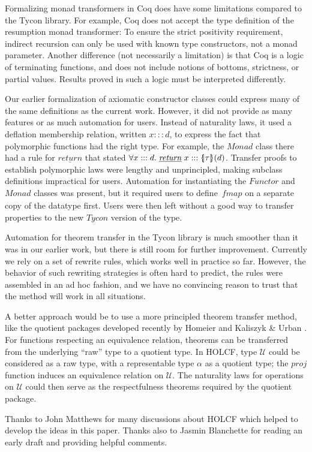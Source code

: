 \documentclass{sigplanconf}
\newcommand{\U}{\ensuremath{\mathcal{U}}}
\newcommand{\univ}[1]{\ensuremath{\underline{#1}}}
\newcommand{\symlbrace}{\mathopen{\lbrace\mkern-4.5mu\mid}}
\newcommand{\symrbrace}{\mathclose{\mid\mkern-4.5mu\rbrace}}
\newcommand{\TC}[1]{\ensuremath{\symlbrace#1\symrbrace}}
\newcommand{\hsc}[1]{\ensuremath{\mathit{#1}}}
\newcommand{\hsprj}{\hsc{proj}}
\newcommand{\fmap}{\,\hsc{fmap}} %
\newcommand{\fmapU}{\univ{\fmap}}
\newcommand{\returnU}{\univ{\hsc{return}}}
\newcommand{\tA}{\alpha}
\theoremstyle{definition}
\begin{document}
Formalizing monad transformers in Coq does have some limitations compared to the Tycon library. For example, Coq does not accept the type definition of the resumption monad transformer: To ensure the strict positivity requirement, indirect recursion can only be used with known type constructors, not a monad parameter. Another difference (not necessarily a limitation) is that Coq is a logic of terminating functions, and does not include notions of bottoms, strictness, or partial values. Results proved in such a logic must be interpreted differently.

Our earlier formalization of axiomatic constructor classes \cite{HMW2005} could express many of the same definitions as the current work. However, it did not provide as many features or as much automation for users. Instead of naturality laws, it used a deflation membership relation, written $x ::: d$, to express the fact that polymorphic functions had the right type. For example, the \hsc{Monad} class there had a rule for $\returnU$ that stated $\forall{x}:::d.\; \returnU\;x ::: \TC{\tau}(d)$. Transfer proofs to establish polymorphic laws were lengthy and unprincipled, making subclass definitions impractical for users. Automation for instantiating the \hsc{Functor} and \hsc{Monad} classes was present, but it required users to define $\fmapU$ on a separate copy of the datatype first. Users were then left without a good way to transfer properties to the new \hsc{Tycon} version of the type.

Automation for theorem transfer in the Tycon library is much smoother than it was in our earlier work, but there is still room for further improvement. Currently we rely on a set of rewrite rules, which works well in practice so far. However, the behavior of such rewriting strategies is often hard to predict, the rules were assembled in an ad hoc fashion, and we have no convincing reason to trust that the method will work in all situations.

A better approach would be to use a more principled theorem transfer method, like the quotient packages developed recently by Homeier \cite{Homeier2005} and Kaliszyk \& Urban \cite{Kaliszyk2011}. For functions respecting an equivalence relation, theorems can be transferred from the underlying ``raw'' type to a quotient type. In HOLCF, type $\U$ could be considered as a raw type, with a representable type $\tA$ as a quotient type; the $\hsprj$ function induces an equivalence relation on $\U$. The naturality laws for operations on $\U$ could then serve as the respectfulness theorems required by the quotient package.

\acks

Thanks to John Matthews for many discussions about HOLCF which helped to develop the ideas in this paper. Thanks also to Jasmin Blanchette for reading an early draft and providing helpful comments.



\end{document}
